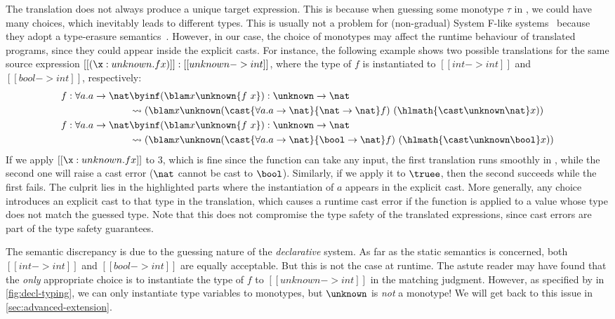 The translation does not always produce a unique target expression. This is
because when guessing some monotype $\tau$ in , we
could have many choices, which inevitably leads to different types. This is
usually not a problem for (non-gradual) System F-like systems~\citep{jones2007practical, dunfield2013complete}
because they adopt a type-erasure semantics~\citep{pierce2002types}. However, in our case, the choice of monotypes may
affect the runtime behaviour of translated programs, since they could appear
inside the explicit casts. For instance, the following example shows two possible
translations for the same source expression $[[ (\x : unknown . f x) ]] : [[unknown -> int]]$,
where the type of $f$ is instantiated to $[[ int -> int ]]$ and $[[ bool -> int ]]$, respectively:
\begin{align*}
  f: \forall a. a \to \nat &\byinf (\blam x \unknown {f ~ x})
                          : \unknown \to \nat \\
                          &\trto (\blam x \unknown (\cast {\forall a. a \to \nat} {\nat \to \nat} f) ~
                          (\hlmath{\cast \unknown \nat} x))
  \\
  f: \forall a. a \to \nat &\byinf (\blam x \unknown {f ~ x})
                          : \unknown \to \nat \\
                          &\trto (\blam x \unknown (\cast {\forall a. a \to \nat} {\bool \to \nat} f) ~
                          (\hlmath{\cast \unknown \bool} x))
\end{align*}
If we apply $[[ \x : unknown . f x  ]]$ to $3$, which is fine
since the function can take any input, the first translation runs smoothly in
\pbc, while the second one will raise a cast error ($\nat$ cannot be cast to
$\bool$). Similarly, if we apply it to $\truee$, then the second succeeds while
the first fails. The culprit lies in the highlighted parts where the 
instantiation of $a$ appears in the explicit cast. More generally, any
choice introduces an explicit cast to that type in the translation, which causes
a runtime cast error if the function is applied to a value whose type does not
match the guessed type. Note that this does not compromise the type safety of
the translated expressions, since cast errors are part of the type safety
guarantees.

The semantic discrepancy is due to the guessing nature of the \emph{declarative}
system. As far as the static semantics is concerned, both $[[ int -> int  ]]$ and
$[[ bool -> int ]]$ are equally acceptable. But this is not the case at runtime.
The astute reader may have found that the \emph{only} appropriate choice is to
instantiate the type of $f$ to $[[ unknown -> int ]]$ in the matching judgment. However, as specified by
 in \cref{fig:decl-typing}, we can only instantiate type variables
to monotypes, but $\unknown$ is \emph{not} a monotype! We will get back to
this issue in \cref{sec:advanced-extension}.

